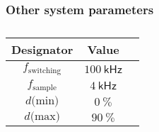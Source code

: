 \subsubsection{Other system parameters}\label{sec:system_params_other}
\begin{table}[H]
\centering
\begin{tabular}{|c|c|c|}
\hline
Designator & Value\\
\hline
$f_\text{switching}$ & $100 \ \mathsf{kHz}$\\
\hline
$f_\text{sample}$ & $4 \ \mathsf{kHz}$\\
\hline
$d \text{(min)}$ & $0 \ \mathsf{\%}$\\
\hline
$d \text{(max)}$ & $90 \ \mathsf{\%}$\\
\hline
\end{tabular}
\caption{}
\label{tab:system_values}
\end{table}
